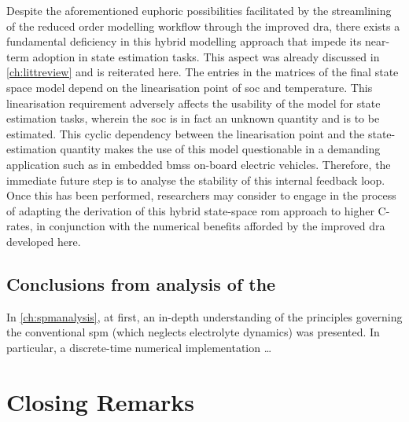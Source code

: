 Despite   the  aforementioned   euphoric   possibilities   facilitated  by   the
streamlining  of  the reduced  order  modelling  workflow through  the  improved
\gls{dra},  there  exists a  fundamental  deficiency  in this  hybrid  modelling
approach  that impede  its near-term  adoption in  state estimation  tasks. This
aspect was already discussed in \cref{ch:littreview} and is reiterated here. The
entries  in  the  matrices  of  the  final  state  space  model  depend  on  the
linearisation point of \gls{soc} and temperature. This linearisation requirement
adversely affects the usability of the model for state estimation tasks, wherein
the \gls{soc} is in fact an unknown quantity and is to be estimated. This cyclic
dependency  between the  linearisation point  and the  state-estimation quantity
makes the use of  this model questionable in a demanding  application such as in
embedded \glspl{bms} on-board electric vehicles. Therefore, the immediate future
step is to analyse  the stability of this internal feedback  loop. Once this has
been performed,  researchers may consider to  engage in the process  of adapting
the derivation of this hybrid  state-space \gls{rom} approach to higher C-rates,
in conjunction  with the numerical  benefits afforded by the  improved \gls{dra}
developed here.


\subsection{Conclusions from analysis of the }

In \cref{ch:spmanalysis}, at first, an  in-depth understanding of the principles
governing the  conventional \gls{spm} (which neglects  electrolyte dynamics) was
presented. In particular, a discrete-time numerical implementation \dots

\section{Closing Remarks}









